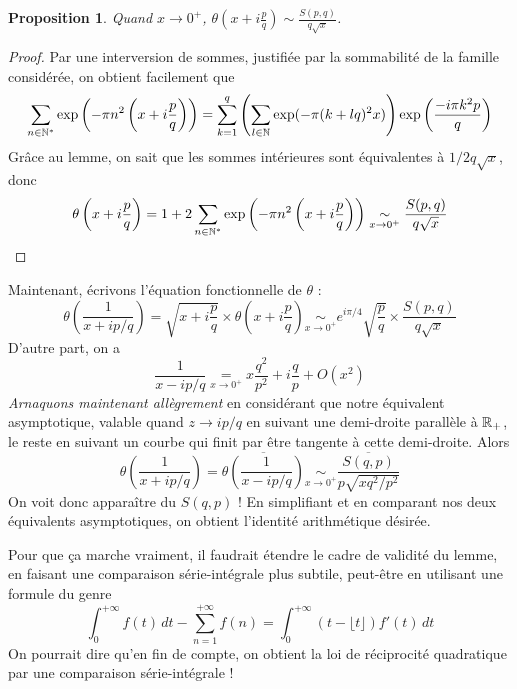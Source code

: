 \documentclass[a4paper, 11pt]{article}
\newtheorem*{proposition}{Proposition}
\begin{document}
\begin{proposition}
  Quand $x \to 0^+$,
  $\displaystyle \theta\left( x + i\frac{p}{q} \right)
  \sim \frac{S(p,q)}{q\sqrt{x}}$.
\end{proposition}

\begin{proof}
  Par une interversion de sommes, justifiée par la sommabilité
  de la famille considérée, on obtient facilement que
  \[ \sum_{n \in \mathbb{N}^*} \exp\left(-\pi n^2 \left( x + i\frac{p}{q}  \right)\right)
    = \sum_{k = 1}^q \left( \sum_{l \in \mathbb{N}} \exp(-\pi(k+lq)^2x) \right)
    \exp\left(\frac{-i\pi k^2 p}{q} \right)
  \]
  Grâce au lemme, on sait que les sommes intérieures sont équivalentes à
  $1/2q\sqrt{x}$, donc
\[ \theta\left( x + i\frac{p}{q} \right) = 1 + 2 \sum_{n \in \mathbb{N}^*}
  \exp\left(-\pi n^2 \left( x + i\frac{p}{q} \right)\right)
      \underset{x \to 0^+}{\sim} \frac{S(p,q)}{q\sqrt{x}}
\]
\end{proof}

Maintenant, écrivons l'équation fonctionnelle de $\theta$ :
  \[ \theta\left( \frac{1}{x + ip/q} \right) =
    \sqrt{x + i\frac{p}{q}} \times \theta\left( x + i\frac{p}{q} \right)
    \underset{x \to 0^+}{\sim} e^{i\pi/4} \sqrt{\frac{p}{q}}
    \times \frac{S(p,q)}{q\sqrt{x}}
  \]
D'autre part, on a
  \[ \frac{1}{x - ip/q} \underset{x \to 0^+}{=}
    x\frac{q^2}{p^2} + i \frac{q}{p} + O(x^2)  \]
\emph{Arnaquons maintenant allègrement} en considérant que notre équivalent
asymptotique, valable quand $z \to ip/q$ en suivant une demi-droite parallèle à
$\mathbb{R}_+$, le reste en suivant un courbe qui finit par être tangente à cette
demi-droite. Alors
\[ \theta\left( \frac{1}{x + ip/q} \right)
  = \overline{\theta\left( \frac{1}{x - ip/q} \right)}
    \underset{x \to 0^+}{\sim} \frac{\overline{S(q,p)}}{p\sqrt{xq^2/p^2}}
  \]
  On voit donc apparaître du $S(q,p)$ ! En simplifiant et en comparant nos deux
  équivalents asymptotiques, on obtient l'identité arithmétique désirée.

Pour que ça marche vraiment, il faudrait étendre le cadre de validité du lemme,
en faisant une comparaison série-intégrale plus subtile, peut-être en utilisant
une formule du genre
  \[ \int_0^{+\infty} f(t)\,dt - \sum_{n=1}^{+\infty} f(n) =
    \int_0^{+\infty} (t - \lfloor t \rfloor)f'(t)\,dt
  \]
  On pourrait dire qu'en fin de compte, on obtient la loi de réciprocité
  quadratique par une comparaison série-intégrale !
\end{document}
